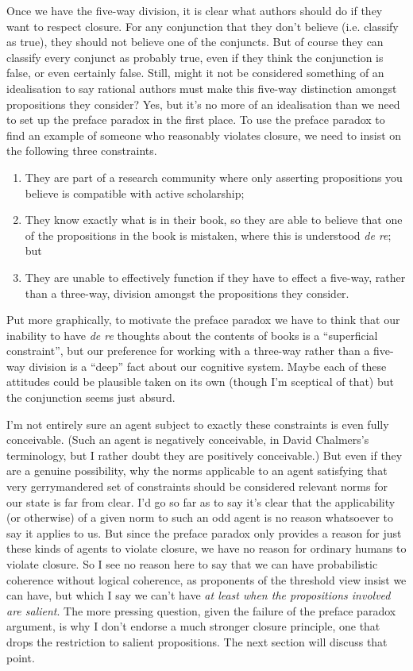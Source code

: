 Once we have the five-way division, it is clear what authors should do if they want to respect closure. For any conjunction that they don't believe (i.e. classify as true), they should not believe one of the conjuncts. But of course they can classify every conjunct as probably true, even if they think the conjunction is false, or even certainly false. Still, might it not be considered something of an idealisation to say rational authors must make this five-way distinction amongst propositions they consider? Yes, but it's no more of an idealisation than we need to set up the preface paradox in the first place. To use the preface paradox to find an example of someone who reasonably violates closure, we need to insist on the following three constraints.

\begin{enumerate}
\renewcommand{\labelenumi}{\alph{enumi})}
\item They are part of a research community where only asserting propositions you believe is compatible with active scholarship;
\item They know exactly what is in their book, so they are able to believe that one of the propositions in the book is mistaken, where this is understood \textit{de re}; but
\item They are unable to effectively function if they have to effect a five-way, rather than a three-way, division amongst the propositions they consider.
\end{enumerate}

\noindent Put more graphically, to motivate the preface paradox we have to think that our inability to have \textit{de re} thoughts about the contents of books is a ``superficial constraint'', but our preference for working with a three-way rather than a five-way division is a ``deep'' fact about our cognitive system. Maybe each of these attitudes could be plausible taken on its own (though I'm sceptical of that) but the conjunction seems just absurd.

I'm not entirely sure an agent subject to exactly these constraints is even fully conceivable. (Such an agent is negatively conceivable, in David Chalmers's terminology, but I rather doubt they are positively conceivable.) But even if they are a genuine possibility, why the norms applicable to an agent satisfying that very gerrymandered set of constraints should be considered relevant norms for our state is far from clear. I'd go so far as to say it's clear that the applicability (or otherwise) of a given norm to such an odd agent is no reason whatsoever to say it applies to us. But since the preface paradox only provides a reason for just these kinds of agents to violate closure, we have no reason for ordinary humans to violate closure. So I see no reason here to say that we can have probabilistic coherence without logical coherence, as proponents of the threshold view insist we can have, but which I say we can't have \textit{at least when the propositions involved are salient}. The more pressing question, given the failure of the preface paradox argument, is why I don't endorse a much stronger closure principle, one that drops the restriction to salient propositions. The next section will discuss that point.

